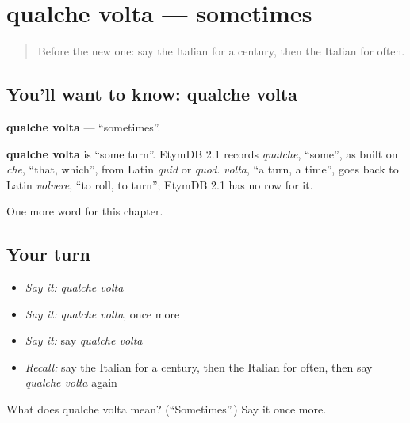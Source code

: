 \section[qualche volta]{qualche volta — sometimes}

\label{lesson:IT-C131-qualche-volta}



\begin{quote}
Before the new one: say the Italian for a century, then the Italian for often.
\end{quote}

\subsection*{You'll want to know: qualche volta}
\textbf{qualche volta} — \textquotedblleft{}sometimes\textquotedblright{}.

\begin{cousinweb}
\textbf{qualche volta} is \textquotedblleft{}some turn\textquotedblright{}. EtymDB 2.1 records \emph{qualche}, \textquotedblleft{}some\textquotedblright{}, as built on \emph{che}, \textquotedblleft{}that, which\textquotedblright{}, from Latin \emph{quid} or \emph{quod}. \emph{volta}, \textquotedblleft{}a turn, a time\textquotedblright{}, goes back to Latin \emph{volvere}, \textquotedblleft{}to roll, to turn\textquotedblright{}; EtymDB 2.1 has no row for it.
\end{cousinweb}

\begin{grammarlens}[title={What you've built}]
One more word for this chapter.
\end{grammarlens}

\subsection*{Your turn}
\begin{itemize}
\raggedright
  \item \emph{Say it:} \emph{qualche volta}
  \item \emph{Say it:} \emph{qualche volta}, once more
  \item \emph{Say it:} say \emph{qualche volta}
  \item \emph{Recall:} say the Italian for a century, then the Italian for often, then say \emph{qualche volta} again
\end{itemize}

\begin{tcolorbox}[breakable,colback=teal!4,colframe=teal!35!black,title={Before you move on}]
What does qualche volta mean? (\textquotedblleft{}Sometimes\textquotedblright{}.) Say it once more.
\end{tcolorbox}
